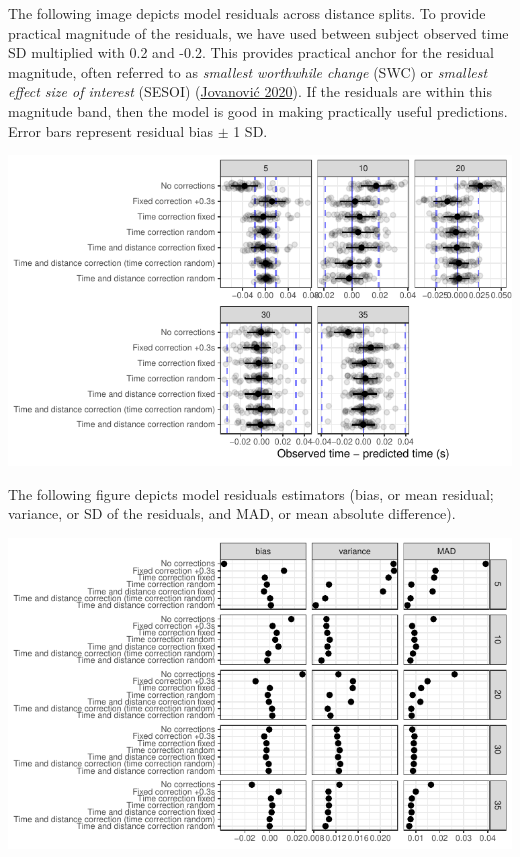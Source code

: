 \documentclass[fleqn,10pt]{wlpeerj} %
\begin{document}
\normalsize

The following image depicts model residuals across distance splits. To provide practical magnitude of the residuals, we have used between subject observed time SD multiplied with 0.2 and -0.2. This provides practical anchor for the residual magnitude, often referred to as \emph{smallest worthwhile change} (SWC) or \emph{smallest effect size of interest} (SESOI) (\protect\hyperlink{ref-jovanovicBmbstatsBootstrapMagnitudebased2020}{Jovanović 2020}). If the residuals are within this magnitude band, then the model is good in making practically useful predictions. Error bars represent residual bias \(\pm\) 1 SD.

\small

\begin{center}\includegraphics[width=0.9\linewidth]{paper_files/figure-latex/unnamed-chunk-49-1} \end{center}

\normalsize

The following figure depicts model residuals estimators (bias, or mean residual; variance, or SD of the residuals, and MAD, or mean absolute difference).

\small

\begin{center}\includegraphics[width=0.9\linewidth]{paper_files/figure-latex/unnamed-chunk-50-1} \end{center}
\end{document}
